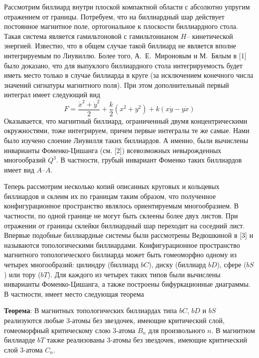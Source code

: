 



\vzmscaption

Рассмотрим биллиард внутри плоской компактной области с абсолютно упругим отражением от границы. Потребуем, что на биллиардный шар действует постоянное магнитное поле, ортогональное к плоскости биллиардного стола. Такая система является гамильтоновой с гамильтонианом $H$-- кинетической энергией. Известно, что в общем случае такой биллиард не является вполне интегрируемым по Лиувиллю. Более того, А.~Е.~Мироновым и М.~Бялым в [1] было доказано, что для выпуклого биллиардного стола интегрируемость будет иметь место только в случае биллиарда в круге (за исключением конечного числа значений сигнатуры магнитного поля). При этом дополнительный первый интеграл имеет следующий вид
$$F=\frac{\dot{x}^2+\dot{y}^2}{2}+\frac{k}{2}(x^2+y^2)+k(x\dot{y}-y\dot{x})$$ 
Оказывается, что магнитный биллиард, ограниченный двумя концентрическими окружностями, тоже интегрируем, причем первые интегралы те же самые. Нами было изучено слоение Лиувилля таких биллиардов. А именно, были вычислены инварианты Фоменко-Цишанга (см. [2]) всевозможных невырожденных многообразий $Q^3$. В частности, грубый инвариант Фоменко таких биллиардов имеет вид $A$--$A$.

Теперь рассмотрим несколько копий описанных круговых и кольцевых биллиардов и склеим их по границам таким образом, что полученное конфигурационное пространство являлось ориентируемым многообразием. В частности, по одной границе не могут быть склеены более двух листов. При отражении от границы склейки биллиардный шар переходит на соседний лист. Впервые подобные биллиардные системы были рассмотрены Ведюшкиной в [3] и называются топологическими биллиардами. Конфигурационное пространство магнитного топологического биллиарда может быть гомеоморфно одному из четырех многообразий: цилиндру (биллиард $bC$), диску (биллиард $bD$), сфере ($bS$) или тору ($bT$). Для каждого из четырех таких типов были вычислены инварианты Фоменко-Цишанга, а также построены бифуркационные диаграммы. В частности, имеет место следующая теорема

\textbf{Теорема}: В магнитных топологических биллиардах типа $bC$, $bD$ и $bS$ реализуются любые 3-атомы без звездочек, имеющие критический слой, гомеоморфный критическому слою 3-атома $B_n$ для произвольного $n$. В магнитном биллиарде $bT$ также реализованы 3-атомы без звездочек, имеющие критический слой 3-атома $C_n$.


